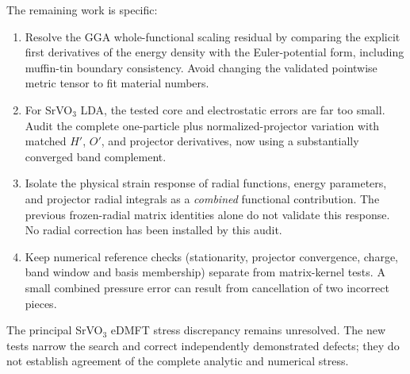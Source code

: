 \documentclass[11pt]{article}
\begin{document}
The remaining work is specific:
\begin{enumerate}
\item Resolve the GGA whole-functional scaling residual by comparing the explicit first derivatives of the energy density with the Euler-potential form, including muffin-tin boundary consistency. Avoid changing the validated pointwise metric tensor to fit material numbers.
\item For SrVO$_3$ LDA, the tested core and electrostatic errors are far too small. Audit the complete one-particle plus normalized-projector variation with matched $H'$, $O'$, and projector derivatives, now using a substantially converged band complement.
\item Isolate the physical strain response of radial functions, energy parameters, and projector radial integrals as a \emph{combined} functional contribution. The previous frozen-radial matrix identities alone do not validate this response. No radial correction has been installed by this audit.
\item Keep numerical reference checks (stationarity, projector convergence, charge, band window and basis membership) separate from matrix-kernel tests. A small combined pressure error can result from cancellation of two incorrect pieces.
\end{enumerate}
The principal SrVO$_3$ eDMFT stress discrepancy remains unresolved. The new tests narrow the search and correct independently demonstrated defects; they do not establish agreement of the complete analytic and numerical stress.
\end{document}

